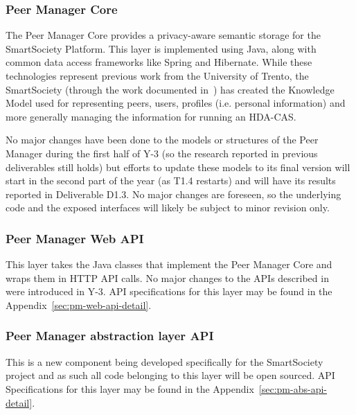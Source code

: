 \subsubsection{Peer Manager Core}
The Peer Manager Core provides a privacy-aware semantic storage for the SmartSociety Platform. This layer is implemented using Java, along with common data access frameworks like Spring and Hibernate.
While these technologies represent previous work from the University of Trento, the SmartSociety (through the work documented in~\cite{D1.1,D4.1,D4.2}) has created the Knowledge Model used for representing peers, users, profiles (i.e. personal information) and more generally managing the information for running an HDA-CAS.

No major changes have been done to the models or structures of the Peer Manager during the first half of Y-3 (so the research reported in previous deliverables still holds) but efforts to update these models to its final version will start in the second part of the year (as T1.4 restarts) and will have its results reported in Deliverable D1.3. No major changes are foreseen, so the underlying code and the exposed interfaces will likely be subject to minor revision only. 

\subsubsection{Peer Manager Web API} \label{ssec:pm-web-api}
This layer takes the Java classes that implement the Peer Manager Core and wraps them in HTTP API calls. 
No major changes to the APIs described in~\cite{D4.2} were introduced in Y-3. API specifications for this layer may be found in the Appendix~\ref{sec:pm-web-api-detail}.

\subsubsection{Peer Manager abstraction layer API} \label{ssec:pm-abs-api}
 
This is a new component being developed specifically for the SmartSociety project and as such all code belonging to this layer will be open sourced. API Specifications for this layer may be found in the Appendix~\ref{sec:pm-abs-api-detail}.



